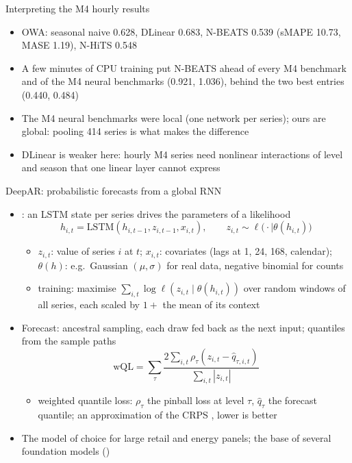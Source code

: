 \begin{frame}{Interpreting the M4 hourly results}
\itemsize{\small}
\begin{itemize}
    \item OWA: seasonal naive 0.628, DLinear 0.683, N-BEATS 0.539 (sMAPE 10.73, MASE 1.19), N-HiTS 0.548
    \item A few minutes of CPU training put N-BEATS ahead of every M4 benchmark and of the M4 neural benchmarks (0.921, 1.036), behind the two best entries (0.440, 0.484)
    \item The M4 neural benchmarks were local (one network per series); ours are global: pooling 414 series is what makes the difference
    \item DLinear is weaker here: hourly M4 series need nonlinear interactions of level and season that one linear layer cannot express
\end{itemize}
\end{frame}

\begin{frame}{DeepAR: probabilistic forecasts from a global RNN}
\itemsize{\small}
\begin{itemize}
    \item {}: an LSTM state per series drives the parameters of a likelihood
    \[ h_{i,t} = \mathrm{LSTM}(h_{i,t-1}, z_{i,t-1}, x_{i,t}), \qquad z_{i,t} \sim \ell\big(\cdot\mid\theta(h_{i,t})\big) \]
    \begin{itemize}
        \item $z_{i,t}$: value of series $i$ at $t$; $x_{i,t}$: covariates (lags at 1, 24, 168, calendar); $\theta(h)$: e.g.\ Gaussian $(\mu, \sigma)$ for real data, negative binomial for counts
        \item training: maximise $\sum_{i,t}\log\ell(z_{i,t}\mid\theta(h_{i,t}))$ over random windows of all series, each scaled by $1 + $ the mean of its context
    \end{itemize}
    \item Forecast: ancestral sampling, each draw fed back as the next input; quantiles from the sample paths
    \[ \mathrm{wQL} = \sum_\tau\frac{2\sum_{i,t}\rho_\tau(z_{i,t} - \hat q_{\tau,i,t})}{\sum_{i,t}|z_{i,t}|} \]
    \begin{itemize}
        \item weighted quantile loss: $\rho_\tau$ the pinball loss at level $\tau$, $\hat q_\tau$ the forecast quantile; an approximation of the CRPS , lower is better
    \end{itemize}
    \item The model of choice for large retail and energy panels; the base of several foundation models ()
\end{itemize}
\end{frame}


